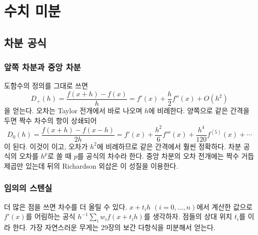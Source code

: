 \chapter{수치 미분}
\label{ch:numdiff}


\section{차분 공식}
\label{sec:fd-formulas}

\subsection{앞쪽 차분과 중앙 차분}

도함수의 정의를 그대로 쓰면 
\[
D_+(h)=\frac{f(x+h)-f(x)}{h}=f'(x)+\frac h2f''(x)+O(h^2)
\]
을 얻는다. 오차는 Taylor 전개에서 바로 나오며 $h$에 비례한다. 양쪽으로 같은 간격을 두면 짝수 차수의 항이 상쇄되어
\[
D_0(h)=\frac{f(x+h)-f(x-h)}{2h}=f'(x)+\frac{h^2}6f'''(x)+\frac{h^4}{120}f^{(5)}(x)+\cdots
\]
이 된다. 이것이 이고, 오차가 $h^2$에 비례하므로 같은 간격에서 훨씬 정확하다. 차분 공식의 오차를 $h^p$로 쓸 때 $p$를 공식의 차수라 한다. 중앙 차분의 오차 전개에는 짝수 거듭제곱만 있는데 뒤의 Richardson 외삽은 이 성질을 이용한다.

\subsection{임의의 스텐실}

더 많은 점을 쓰면 차수를 더 올릴 수 있다. $x+t_ih$ $(i=0,\dots,n)$에서 계산한 값으로 $f'(x)$를 어림하는 공식 $h^{-1}\sum_iw_if(x+t_ih)$를 생각하자. 점들의 상대 위치 $t_i$를 이라 한다. 가장 자연스러운 무게는 29장의 보간 다항식을 미분해서 얻는다.

